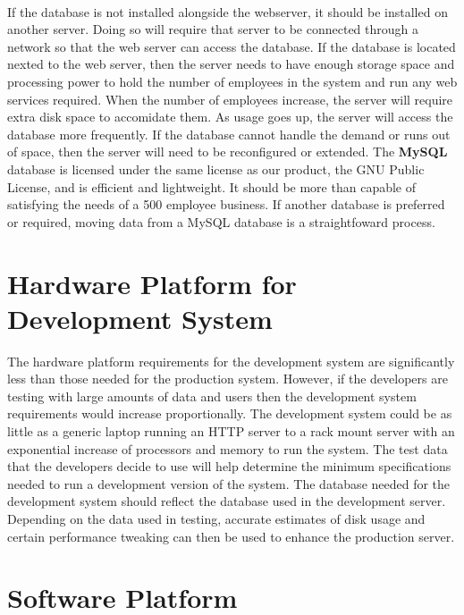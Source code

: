 \documentclass[letterpaper,12pt]{report}
\begin{document}
\paragraph*{}\hspace{0.6cm}If the database is not installed alongside the webserver, it should be installed on another server. Doing so will require that server to be connected through a network so that the web server can access the database. If the database is located nexted to the web server, then the server needs to have enough storage space and processing power to hold the number of employees in the system and run any web services required. When the number of employees increase, the server will require extra disk space to accomidate them. As usage goes up, the server will access the database more frequently. If the database cannot handle the demand or runs out of space, then the server will need to be reconfigured or extended. The \textbf{MySQL} database is licensed under the same license as our product, the GNU Public License, and is efficient and lightweight. It should be more than capable of satisfying the needs of a  500 employee business. If another database is preferred or required, moving data from a MySQL database is a straightfoward process.
\pagebreak
\section{Hardware Platform for Development System}
The hardware platform requirements for the development system are significantly less than those needed for the production system. However, if the developers are testing with large amounts of data and users then the development system requirements would increase proportionally. The development system could be as little as a generic laptop running an HTTP server to a rack mount server with an exponential increase of processors and memory to run the system. The test data that the developers decide to use will help determine the minimum specifications needed to run a development version of the system.
The database needed for the development system should reflect the database used in the development server. Depending on the data used in testing, accurate estimates of disk usage and certain performance tweaking can then be used to enhance the production server.

\pagebreak
\section{Software Platform}
\end{document}
